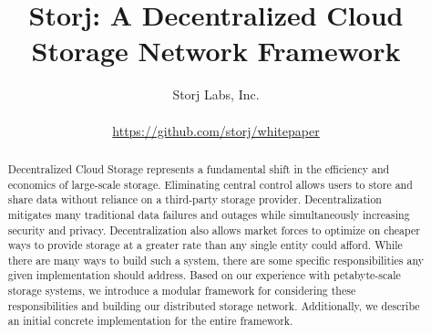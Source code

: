 \documentclass[a4paper,10pt]{article} \usepackage[utf8]{inputenc}
\title{\textbf{Storj: A Decentralized Cloud Storage Network Framework}}
\author{\parbox{\linewidth}{\centering\small
Storj Labs, Inc.}
\\\small \url{https://github.com/storj/whitepaper} }\date
\begin{document}
\maketitle

\begin{abstract}

Decentralized Cloud Storage represents a fundamental shift in
the efficiency and economics of large-scale storage.
Eliminating central control allows users to store and share data
without reliance on a third-party storage provider. Decentralization mitigates
many traditional data failures and outages while simultaneously increasing
security and privacy.
Decentralization also allows market forces to optimize on cheaper ways to
provide storage at a greater rate than any single entity could afford.
While there are many ways to build such a system, there are some specific
responsibilities any given implementation should address.
Based on our experience with petabyte-scale
storage systems, we introduce a modular framework for considering these
responsibilities and building our distributed storage network.
Additionally, we describe an initial
concrete implementation for the entire framework.
\end{abstract}
\end{document}
